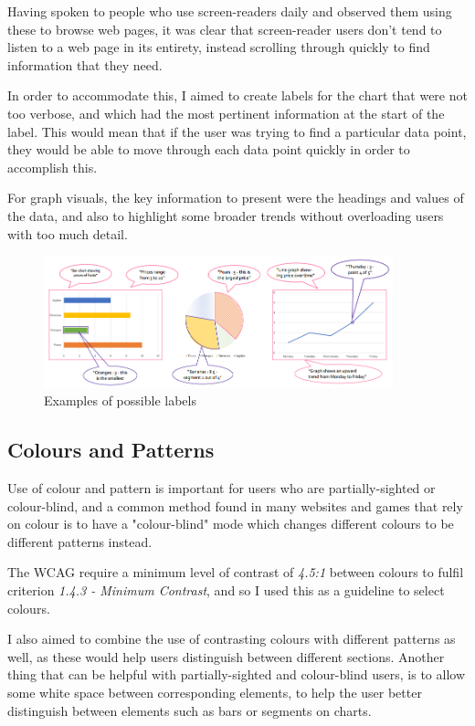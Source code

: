 \documentclass[ %
                    author={Aleena Baig},
                supervisor={Dr Simon Lock},
                    degree={BSc},
                     title={On Making Web Accessible Graphs},
                  subtitle={},
                      year={2019} ]{dissertation}
\begin{document}
Having spoken to people who use screen-readers daily and observed them using these to browse web pages, it was clear that screen-reader users don't tend to listen to a web page in its entirety, instead scrolling through quickly to find information that they need.

In order to accommodate this, I aimed to create labels for the chart that were not too verbose, and which had the most pertinent information at the start of the label. This would mean that if the user was trying to find a particular data point, they would be able to move through each data point quickly in order to accomplish this.

For graph visuals, the key information to present were the headings and values of the data, and also to highlight some broader trends without overloading users with too much detail.

\begin{figure}[h]
\centering
\includegraphics[width=0.9\textwidth]{images/GraphDesignWithReadouts.PNG}
\caption{Examples of possible labels}
\end{figure}

\subsection{Colours and Patterns}

Use of colour and pattern is important for users who are partially-sighted or colour-blind, and a common method found in many websites and games that rely on colour is to have a "colour-blind" mode which changes different colours to be different patterns instead.

The WCAG require a minimum level of contrast of \textit{4.5:1} between colours to fulfil criterion \textit{1.4.3 - Minimum Contrast}, and so I used this as a guideline to select colours.

I also aimed to combine the use of contrasting colours with different patterns as well, as these would help users distinguish between different sections. Another thing that can be helpful with partially-sighted and colour-blind users, is to allow some white space between corresponding elements, to help the user better distinguish between elements such as bars or segments on charts.
\end{document}
